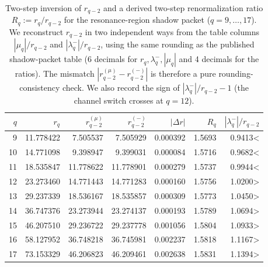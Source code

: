 \begin{table}[H]
\centering
\scriptsize
\setlength{\tabcolsep}{5pt}
\renewcommand{\arraystretch}{1.15}
\caption{Two-step inversion of $r_{q-2}$ and a derived two-step renormalization ratio $R_q:=r_q/r_{q-2}$ for the resonance-region shadow packet ($q=9,\dots,17$). We reconstruct $r_{q-2}$ in two independent ways from the table columns $|\mu_q|/r_{q-2}$ and $|\lambda_q^-|/r_{q-2}$, using the same rounding as the published shadow-packet table (6 decimals for $r_q,\lambda_q^-,|\mu_q|$ and 4 decimals for the ratios). The mismatch $|r_{q-2}^{(\mu)}-r_{q-2}^{(-)}|$ is therefore a pure rounding-consistency check. We also record the sign of $|\lambda_q^-|/r_{q-2}-1$ (the channel switch crosses at $q=12$).}
\label{tab:fold_collision_shadow_spectral_packet_two_step_renormalization_q9_17}
\begin{tabular}{r r r r r r r}
\toprule
$q$ & $r_q$ & $r_{q-2}^{(\mu)}$ & $r_{q-2}^{(-)}$ & $|\Delta r|$ & $R_q$ & $|\lambda_q^-|/r_{q-2}$\\
\midrule
9 & 11.778422 & 7.505537 & 7.505929 & 0.000392 & 1.5693 & 0.9413<\\
10 & 14.771098 & 9.398947 & 9.399031 & 0.000084 & 1.5716 & 0.9682<\\
11 & 18.535847 & 11.778622 & 11.778901 & 0.000279 & 1.5737 & 0.9944<\\
12 & 23.273460 & 14.771443 & 14.771283 & 0.000160 & 1.5756 & 1.0200>\\
13 & 29.237339 & 18.536167 & 18.535857 & 0.000309 & 1.5773 & 1.0450>\\
14 & 36.747376 & 23.273944 & 23.274137 & 0.000193 & 1.5789 & 1.0694>\\
15 & 46.207510 & 29.236722 & 29.237778 & 0.001056 & 1.5804 & 1.0933>\\
16 & 58.127952 & 36.748218 & 36.745981 & 0.002237 & 1.5818 & 1.1167>\\
17 & 73.153329 & 46.206823 & 46.209461 & 0.002638 & 1.5831 & 1.1394>\\
\bottomrule
\end{tabular}
\end{table}
